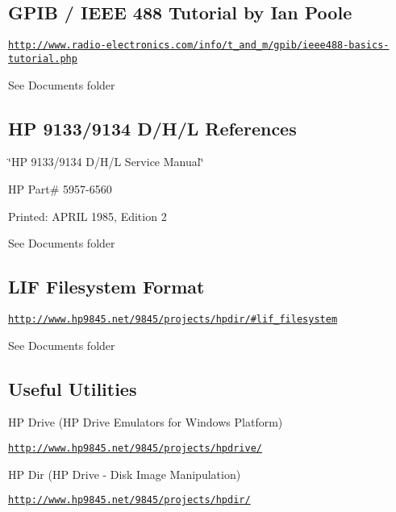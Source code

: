 \subsection*{G\+P\+IB / I\+E\+EE 488 Tutorial by Ian Poole}


\begin{DoxyItemize}
\item \href{http://www.radio-electronics.com/info/t_and_m/gpib/ieee488-basics-tutorial.php}{\tt http\+://www.\+radio-\/electronics.\+com/info/t\+\_\+and\+\_\+m/gpib/ieee488-\/basics-\/tutorial.\+php}
\end{DoxyItemize}

See Documents folder

\subsection*{HP 9133/9134 D/\+H/L References}


\begin{DoxyItemize}
\item \char`\"{}\+H\+P 9133/9134 D/\+H/\+L Service Manual\char`\"{}
\item HP Part\# 5957-\/6560
\item Printed\+: A\+P\+R\+IL 1985, Edition 2
\item See Documents folder
\end{DoxyItemize}

\subsection*{L\+IF Filesystem Format}


\begin{DoxyItemize}
\item \href{http://www.hp9845.net/9845/projects/hpdir/#lif_filesystem}{\tt http\+://www.\+hp9845.\+net/9845/projects/hpdir/\#lif\+\_\+filesystem}
\item See Documents folder
\end{DoxyItemize}

\subsection*{Useful Utilities}


\begin{DoxyItemize}
\item HP Drive (HP Drive Emulators for Windows Platform)
\begin{DoxyItemize}
\item \href{http://www.hp9845.net/9845/projects/hpdrive/}{\tt http\+://www.\+hp9845.\+net/9845/projects/hpdrive/}
\end{DoxyItemize}
\item HP Dir (HP Drive -\/ Disk Image Manipulation)
\begin{DoxyItemize}
\item \href{http://www.hp9845.net/9845/projects/hpdir/}{\tt http\+://www.\+hp9845.\+net/9845/projects/hpdir/}
\end{DoxyItemize}
\end{DoxyItemize}






